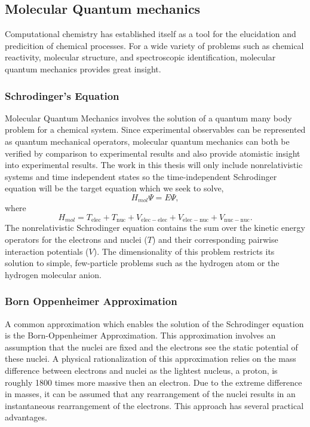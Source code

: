 \subsection{Molecular Quantum mechanics}
Computational chemistry has established itself as a tool for the elucidation and predicition of chemical processes.
For a wide variety of problems such as chemical reactivity, molecular structure, and spectroscopic identification, molecular quantum mechanics provides great insight.

\subsubsection{Schrodinger's Equation}
Molecular Quantum Mechanics  involves the solution of a quantum many body problem for a chemical system. Since experimental observables can be represented as quantum mechanical operators, molecular quantum mechanics can both be verified by comparison to experimental results and also provide atomistic insight into experimental results.
The work in this thesis will only include nonrelativistic systems and time independent states so the time-independent Schrodinger equation will be the target equation which we seek to solve,
\begin{equation}
H_{mol} \Psi = E \Psi,
\end{equation}
where
\begin{equation}
H_{mol} = T_{\mathrm{elec}} + T_{\mathrm{nuc}} + V_{\mathrm{elec-elec}} + V_{\mathrm{elec-nuc}} + V_{\mathrm{nuc-nuc}}.
\end{equation}
The nonrelativistic Schrodinger equation contains the sum over the kinetic energy operators for the electrons and nuclei ($T$) and their corresponding pairwise interaction potentials ($V$).
The dimensionality of this problem restricts its solution to simple, few-particle problems such as the hydrogen atom or the hydrogen molecular anion.

\subsubsection{Born Oppenheimer Approximation}
A common approximation which enables the solution of the Schrodinger equation is the Born-Oppenheimer Approximation.
This approximation involves an assumption that the nuclei are fixed and the electrons see the static potential of these nuclei.
A physical rationalization of this approximation relies on the mass difference between electrons and nuclei as the lightest nucleus, a proton, is roughly 1800 times more massive then an electron.
Due to the extreme difference in masses, it can be assumed that any rearrangement of the nuclei results in an instantaneous rearrangement of the electrons.
This approach has several practical advantages.

